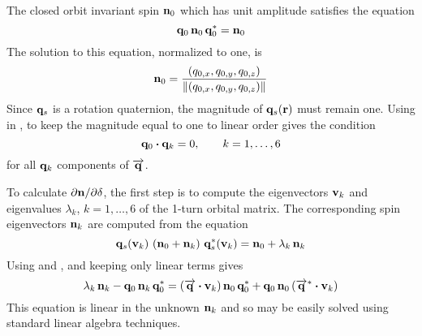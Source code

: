 The closed orbit invariant spin ${\bf n}_0$ which has unit amplitude satisfies the equation
\begin{equation}
  {\bf q}_0 \, {\bf n}_0 \, {\bf q}_0^* = {\bf n}_0
  \label{qnqn}
\end{equation}
The solution to this equation, normalized to one, is
\begin{equation}
  {\bf n}_0 = \frac{(q_{0,x}, q_{0,y}, q_{0,z})}{\|(q_{0,x}, q_{0,y}, q_{0,z})\|}
  \label{nkqqq}
\end{equation}
Since ${\bf q}_s$ is a rotation quaternion, the magnitude of ${\bf q}_s({\bf r})$ must remain one. Using
 in , to keep the magnitude equal to one to linear order gives the condition
\begin{equation}
  {\bf q}_0 \mathbin{\boldsymbol{\cdot}} {\bf q}_k = 0, \qquad k = 1, \ldots, 6
\end{equation}
for all ${\bf q}_k$ components of $\overrightarrow{{\bf q}}$.

To calculate $\partial{\bf n}/\partial\delta$, the first step is to compute the eigenvectors ${\bf v}_k$ and
eigenvalues $\lambda_k$, $k = 1, \ldots, 6$ of the 1-turn orbital matrix. The
corresponding spin eigenvectors ${\bf n}_k$ are computed from the equation
\begin{equation}
  {\bf q}_s({\bf v}_k) \,\, ({\bf n}_0 + {\bf n}_k) \,\, {\bf q}_s^*({\bf v}_k) = {\bf n}_0 + \lambda_k \, {\bf n}_k
  \label{qnnq}
\end{equation}
Using  and , and keeping only linear terms gives
\begin{equation}
  \lambda_k \, {\bf n}_k - {\bf q}_0 \, {\bf n}_k \, {\bf q}_0^* = 
  (\overrightarrow{{\bf q}} \mathbin{\boldsymbol{\cdot}} {\bf v}_k) \, {\bf n}_0 \, {\bf q}_0^* + 
  {\bf q}_0 \, {\bf n}_0 \, (\overrightarrow{{\bf q}}^* \mathbin{\boldsymbol{\cdot}} {\bf v}_k)
  \label{lnqnq}
\end{equation}
This equation is linear in the unknown ${\bf n}_k$ and so may be easily solved using standard linear
algebra techniques.

